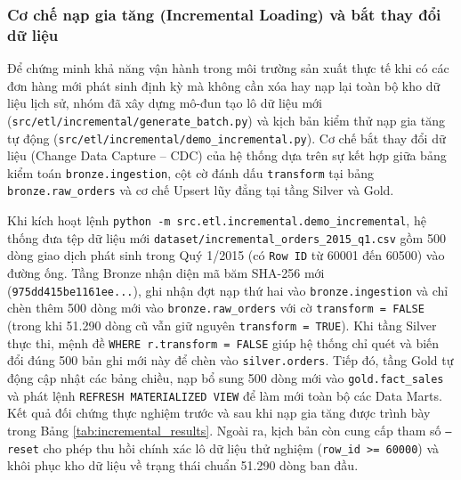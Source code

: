 \subsubsection{Cơ chế nạp gia tăng (Incremental Loading) và bắt thay đổi dữ liệu}

Để chứng minh khả năng vận hành trong môi trường sản xuất thực tế khi có các đơn hàng mới phát sinh định kỳ mà không cần xóa hay nạp lại toàn bộ kho dữ liệu lịch sử, nhóm đã xây dựng mô-đun tạo lô dữ liệu mới (\texttt{src/etl/incremental/generate\_batch.py}) và kịch bản kiểm thử nạp gia tăng tự động (\texttt{src/etl/incremental/demo\_incremental.py}). Cơ chế bắt thay đổi dữ liệu (Change Data Capture -- CDC) của hệ thống dựa trên sự kết hợp giữa bảng kiểm toán \texttt{bronze.ingestion}, cột cờ đánh dấu \texttt{transform} tại bảng \texttt{bronze.raw\_orders} và cơ chế Upsert lũy đẳng tại tầng Silver và Gold.

Khi kích hoạt lệnh \texttt{python -m src.etl.incremental.demo\_incremental}, hệ thống đưa tệp dữ liệu mới \texttt{dataset/incremental\_orders\_2015\_q1.csv} gồm 500 dòng giao dịch phát sinh trong Quý 1/2015 (có \texttt{Row ID} từ 60001 đến 60500) vào đường ống. Tầng Bronze nhận diện mã băm SHA-256 mới (\texttt{975dd415be1161ee...}), ghi nhận đợt nạp thứ hai vào \texttt{bronze.ingestion} và chỉ chèn thêm 500 dòng mới vào \texttt{bronze.raw\_orders} với cờ \texttt{transform = FALSE} (trong khi 51.290 dòng cũ vẫn giữ nguyên \texttt{transform = TRUE}). Khi tầng Silver thực thi, mệnh đề \texttt{WHERE r.transform = FALSE} giúp hệ thống chỉ quét và biến đổi đúng 500 bản ghi mới này để chèn vào \texttt{silver.orders}. Tiếp đó, tầng Gold tự động cập nhật các bảng chiều, nạp bổ sung 500 dòng mới vào \texttt{gold.fact\_sales} và phát lệnh \texttt{REFRESH MATERIALIZED VIEW} để làm mới toàn bộ các Data Marts. Kết quả đối chứng thực nghiệm trước và sau khi nạp gia tăng được trình bày trong Bảng \ref{tab:incremental_results}. Ngoài ra, kịch bản còn cung cấp tham số \texttt{--reset} cho phép thu hồi chính xác lô dữ liệu thử nghiệm (\texttt{row\_id >= 60000}) và khôi phục kho dữ liệu về trạng thái chuẩn 51.290 dòng ban đầu.

